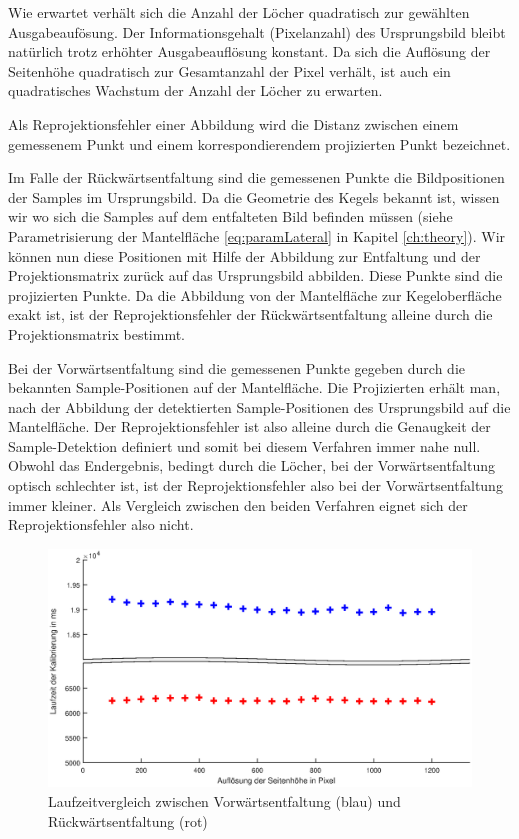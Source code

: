 Wie erwartet verhält sich die Anzahl der Löcher quadratisch zur gewählten Ausgabeaufösung. Der Informationsgehalt (Pixelanzahl) des Ursprungsbild bleibt natürlich trotz erhöhter Ausgabeauflösung konstant. Da sich die Auflösung der Seitenhöhe quadratisch zur Gesamtanzahl der Pixel verhält, ist auch ein quadratisches Wachstum der Anzahl der Löcher zu erwarten. 
\bigskip

Als Reprojektionsfehler einer Abbildung wird die Distanz zwischen einem gemessenem Punkt und einem korrespondierendem projizierten Punkt bezeichnet. 
\bigskip

Im Falle der Rückwärtsentfaltung sind die gemessenen Punkte die Bildpositionen der Samples im Ursprungsbild. Da die Geometrie des Kegels bekannt ist, wissen wir wo sich die  Samples auf dem entfalteten Bild befinden müssen (siehe Parametrisierung der Mantelfläche \ref{eq:paramLateral} in Kapitel \ref{ch:theory}). Wir können nun diese Positionen mit Hilfe der Abbildung zur Entfaltung und der Projektionsmatrix zurück auf das Ursprungsbild abbilden. Diese Punkte sind die projizierten Punkte. Da die Abbildung von der Mantelfläche zur Kegeloberfläche exakt ist, ist der Reprojektionsfehler der Rückwärtsentfaltung alleine durch die Projektionsmatrix bestimmt. 

Bei der Vorwärtsentfaltung sind die gemessenen Punkte gegeben durch die bekannten Sample-Positionen auf der Mantelfläche. Die Projizierten erhält man, nach der Abbildung der detektierten Sample-Positionen des Ursprungsbild auf die Mantelfläche. Der Reprojektionsfehler ist also alleine durch die Genaugkeit der Sample-Detektion definiert und somit bei diesem Verfahren immer nahe null. 
Obwohl das Endergebnis, bedingt durch die Löcher, bei der Vorwärtsentfaltung optisch schlechter ist, ist der Reprojektionsfehler also bei der Vorwärtsentfaltung immer kleiner. 
Als Vergleich zwischen den beiden Verfahren eignet sich der Reprojektionsfehler also nicht.

\begin{figure}[!htb]
	\centering
	\includegraphics[width=\textwidth]{images/runningTimeCalibration.eps}
	\caption{Laufzeitvergleich zwischen Vorwärtsentfaltung (blau) und Rückwärtsentfaltung (rot)}
	\label{fig:runningTimeComparision}
\end{figure}

